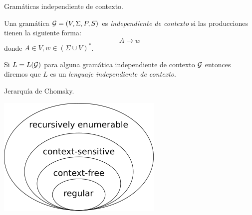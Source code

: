 \documentclass[aspectratio=169, 11pt]{beamer}
\begin{document}
	\begin{frame}{Gramáticas independiente de contexto.}
		\begin{deff}
			Una gramática ${\cal G} = (V, \Sigma, P, S) $ es \emph{independiente de contexto} si las producciones tienen la siguiente forma:
			\begin{equation*}
				A \to w
			\end{equation*}
			donde $A \in V, w \in (\Sigma \cup V)^*$.  
			
			Si $L=L({\cal G})$ para alguna gramática independiente de contexto $\cal G$ entonces diremos que $L$ es un \emph{lenguaje independiente de contexto}.

		\end{deff}
		
	\end{frame}

	\begin{frame}{Jerarquía de Chomsky.}

			\centering
			\includegraphics[scale = 0.65]{Chomsky-hierarchy.png}
		
	\end{frame}
\end{document}
